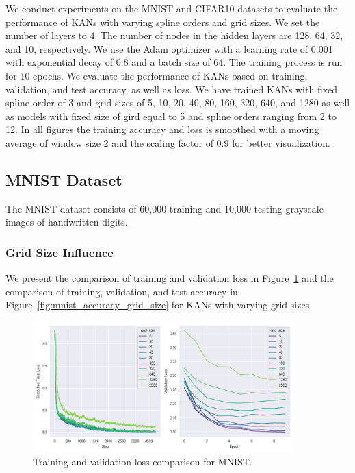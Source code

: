 \documentclass{article}
\begin{document}
We conduct experiments on the MNIST and CIFAR10 datasets to evaluate the performance of KANs with varying spline orders and grid sizes.
We set the number of layers to 4.
The number of nodes in the hidden layers are 128, 64, 32, and 10, respectively.
We use the Adam optimizer with a learning rate of 0.001 with exponential decay of 0.8 and a batch size of 64.
The training process is run for 10 epochs.
We evaluate the performance of KANs based on training, validation, and test accuracy, as well as loss.
We have trained KANs with fixed spline order of 3 and grid sizes of 5, 10, 20, 40, 80, 160, 320, 640, and 1280 as well as
models with fixed size of gird equal to 5 and spline orders ranging from 2 to 12.
In all figures the training accuracy and loss is smoothed with a moving average of window size 2 and the scaling factor of 0.9
for better visualization.


\subsection{MNIST Dataset}\label{subsec:mnist}

The MNIST dataset consists of 60,000 training and 10,000 testing grayscale images of handwritten digits.

\subsubsection{Grid Size Influence}\label{subsubsec:grid-size-influence}

We present the comparison of training and validation loss in Figure~\ref{fig:mnist_loss_grid_size}
and the comparison of training, validation, and test accuracy in Figure~\ref{fig:mnist_accuracy_grid_size} for KANs with varying grid sizes.


\begin{figure}[H]
    \centering
    \includegraphics[width=0.9\textwidth]{pics/mnist_loss_grid_size}
    \caption{Training and validation loss comparison for MNIST.}
    \label{fig:mnist_loss_grid_size}
\end{figure}
\end{document}
